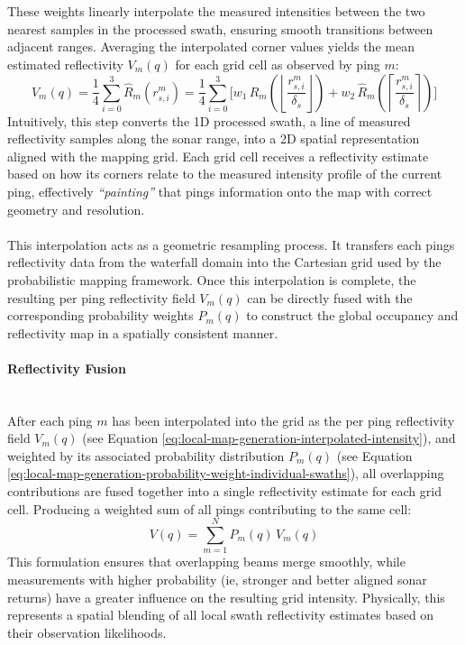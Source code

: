 \\ \\
These weights linearly interpolate the measured intensities between the two nearest samples in the processed swath, ensuring smooth transitions between adjacent ranges. Averaging the interpolated corner values yields the mean estimated reflectivity $V_m(q)$ for each grid cell as observed by ping $m$:
\begin{equation}
    V_m(q) = \frac{1}{4}\sum_{i=0}^{3}\hat{R}_m(r_{s,i}^m)
    =
    \frac{1}{4}\sum_{i=0}^{3}
    \Bigg[
        w_1 \, \hat{R}_m\!\left(
            \left\lfloor \frac{r_{s,i}^m}{\delta_s} \right\rfloor
        \right)
        +
        w_2 \, \hat{R}_m\!\left(
            \left\lceil \frac{r_{s,i}^m}{\delta_s} \right\rceil
        \right)
    \Bigg]
    \label{eq:local-map-generation-interpolated-intensity}
\end{equation}
Intuitively, this step converts the 1D processed swath, a line of measured reflectivity samples along the sonar range, into a 2D spatial representation aligned with the mapping grid. Each grid cell receives a reflectivity estimate based on how its corners relate to the measured intensity profile of the current ping, effectively \textit{``painting''} that pings information onto the map with correct geometry and resolution.  
\\ \\
This interpolation acts as a geometric resampling process. It transfers each pings reflectivity data from the waterfall domain into the Cartesian grid used by the probabilistic mapping framework. Once this interpolation is complete, the resulting per ping reflectivity field $V_m(q)$ can be directly fused with the corresponding probability weights $P_m(q)$ to construct the global occupancy and reflectivity map in a spatially consistent manner.

\paragraph{Reflectivity Fusion} \mbox{}\\[0.5em] \noindent 
After each ping $m$ has been interpolated into the grid as the per ping reflectivity field $V_m(q)$ (see Equation \ref{eq:local-map-generation-interpolated-intensity}), and weighted by its associated probability distribution $P_m(q)$ (see Equation \ref{eq:local-map-generation-probability-weight-individual-swaths}), all overlapping contributions are fused together into a single reflectivity estimate for each grid cell. Producing a weighted sum of all pings contributing to the same cell:
\begin{equation}
    V(q) = \sum_{m=1}^{N} P_m(q) \, V_m(q)
    \label{eq:local-map-generation-reflectivity-fusion}
\end{equation}
This formulation ensures that overlapping beams merge smoothly, while measurements with higher probability (ie, stronger and better aligned sonar returns) have a greater influence on the resulting grid intensity. Physically, this represents a spatial blending of all local swath reflectivity estimates based on their observation likelihoods.

